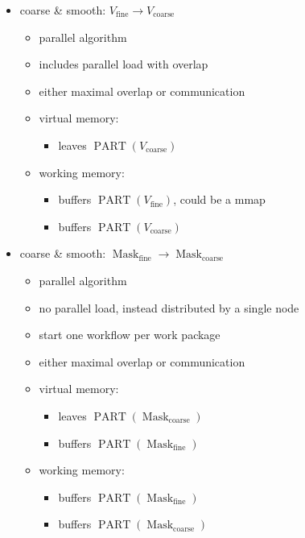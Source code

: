 \documentclass[12pt,a4paper]{article}
\DeclareMathOperator{\mask}{Mask}
\DeclareMathOperator{\fine}{fine}
\DeclareMathOperator{\coarse}{coarse}
\newcommand{\fieldfine}{V_{\fine}}
\newcommand{\fieldcoarse}{V_{\coarse}}
\newcommand{\maskfine}{\mask_{\fine}}
\newcommand{\maskcoarse}{\mask_{\coarse}}
\DeclareMathOperator{\oppartof}{PART}
\newcommand{\parens}[3]{#1#3#2}
\newcommand{\K}[1]{\parens{(}{)}{#1}}
\newcommand{\partof}[1]{\oppartof{}\K{#1}}
\begin{document}
\begin{itemize}
\item coarse \& smooth: $\fieldfine \to \fieldcoarse$
  \begin{itemize}
  \item parallel algorithm
  \item includes parallel load with overlap
  \item either maximal overlap or communication
  \item virtual memory:
    \begin{itemize}
    \item leaves $\partof{\fieldcoarse}$
    \end{itemize}
  \item working memory:
    \begin{itemize}
    \item buffers $\partof{\fieldfine}$, could be a mmap
    \item buffers $\partof{\fieldcoarse}$
    \end{itemize}
  \end{itemize}

\item coarse \& smooth: $\maskfine \to \maskcoarse$
  \begin{itemize}
  \item parallel algorithm
  \item no parallel load, instead distributed by a single node
  \item start one workflow per work package
  \item either maximal overlap or communication
  \item virtual memory:
    \begin{itemize}
    \item leaves $\partof{\maskcoarse}$
    \item buffers $\partof{\maskfine}$
    \end{itemize}
  \item working memory:
    \begin{itemize}
    \item buffers $\partof{\maskfine}$
    \item buffers $\partof{\maskcoarse}$
    \end{itemize}
  \end{itemize}


\end{itemize}
\end{document}
